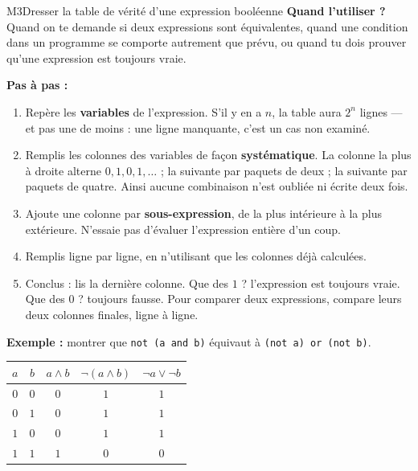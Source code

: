\begin{fichemethode}{M3}{Dresser la table de vérité d'une expression booléenne}
\textbf{Quand l'utiliser ?} Quand on te demande si deux expressions sont équivalentes, quand
une condition dans un programme se comporte autrement que prévu, ou quand tu dois prouver
qu'une expression est toujours vraie.

\textbf{Pas à pas :}
\begin{enumerate}
  \item Repère les \textbf{variables} de l'expression. S'il y en a $n$, la table aura
    $2^{n}$ lignes — et pas une de moins : une ligne manquante, c'est un cas non examiné.
  \item Remplis les colonnes des variables de façon \textbf{systématique}. La colonne la plus
    à droite alterne $0,1,0,1,\dots$ ; la suivante par paquets de deux ; la suivante par
    paquets de quatre. Ainsi aucune combinaison n'est oubliée ni écrite deux fois.
  \item Ajoute une colonne par \textbf{sous-expression}, de la plus intérieure à la plus
    extérieure. N'essaie pas d'évaluer l'expression entière d'un coup.
  \item Remplis ligne par ligne, en n'utilisant que les colonnes déjà calculées.
  \item Conclus : lis la dernière colonne. Que des $1$ ? l'expression est toujours vraie.
    Que des $0$ ? toujours fausse. Pour comparer deux expressions, compare leurs deux
    colonnes finales, ligne à ligne.
\end{enumerate}

\textbf{Exemple :} montrer que \lstinline{not (a and b)} équivaut à
\lstinline{(not a) or (not b)}.

\begin{center}
\begin{tabular}{cc|c|c|c}
$a$ & $b$ & $a \wedge b$ & $\neg(a \wedge b)$ & $\neg a \vee \neg b$ \\
\hline
$0$ & $0$ & $0$ & $1$ & $1$ \\
$0$ & $1$ & $0$ & $1$ & $1$ \\
$1$ & $0$ & $0$ & $1$ & $1$ \\
$1$ & $1$ & $1$ & $0$ & $0$ \\
\end{tabular}
\end{center}


\end{fichemethode}

